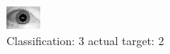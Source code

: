 \begin{figure}[h!]
\begin{center}
\includegraphics[width=0.60\columnwidth]{figures/ID1634_class_3_target_2.png}
\end{center}
\caption{ Classification: 3 actual target: 2}
\label{fig:ID1634_class_3_target_2}
\end{figure}
